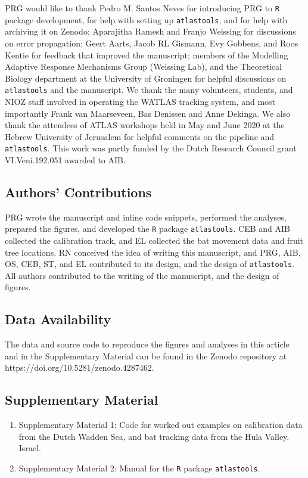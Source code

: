\documentclass[10pt,paper=a4,headings=standardclasses
]{scrartcl}
\begin{document}
PRG would like to thank Pedro M. Santos Neves for introducing PRG to \texttt{R} package development, for help with setting up \texttt{atlastools}, and for help with archiving it on Zenodo; 
Aparajitha Ramesh and Franjo Weissing for discussions on error propagation;
Geert Aarts, Jacob RL Gismann, Evy Gobbens, and Roos Kentie for feedback that improved the manuscript; 
members of the Modelling Adaptive Response Mechanisms Group (Weissing Lab), and the Theoretical Biology department at the University of Groningen for helpful discussions on \texttt{atlastools} and the manuscript.
We thank the many volunteers, students, and NIOZ staff involved in operating the WATLAS tracking system, and most importantly Frank van Maarseveen, Bas Denissen and Anne Dekinga.
We also thank the attendees of ATLAS workshops held in May and June 2020 at the Hebrew University of Jerusalem for helpful comments on the pipeline and \texttt{atlastools}.
This work was partly funded by the Dutch Research Council grant VI.Veni.192.051 awarded to AIB.

\subsection{Authors' Contributions}

PRG wrote the manuscript and inline code snippets, performed the analyses, prepared the figures, and developed the \texttt{R} package \texttt{atlastools}.
CEB and AIB collected the calibration track, and EL collected the bat movement data and fruit tree locations.
RN conceived the idea of writing this manuscript, and PRG, AIB, OS, CEB, ST, and EL contributed to its design, and the design of \texttt{atlastools}.
All authors contributed to the writing of the manuscript, and the design of figures.

\subsection{Data Availability}

The data and source code to reproduce the figures and analyses in this article and in the Supplementary Material can be found in the Zenodo repository at https://doi.org/10.5281/zenodo.4287462.

\subsection{Supplementary Material}
\begin{enumerate}
    \item Supplementary Material 1: Code for worked out examples on calibration data from the Dutch Wadden Sea, and bat tracking data from the Hula Valley, Israel.
    \item Supplementary Material 2: Manual for the \texttt{R} package \texttt{atlastools}.
\end{enumerate}
\end{document}
